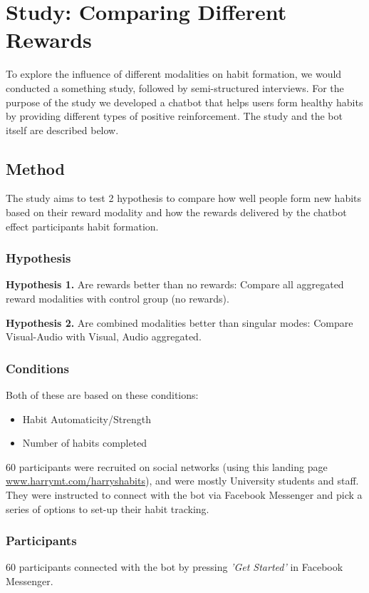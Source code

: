 \documentclass{scaffold/sigchi}
\begin{document}
\section{Study: Comparing Different Rewards}
To explore the influence of different modalities on habit formation, we would conducted a something study, followed by semi-structured interviews. For the purpose of the study we developed a chatbot that helps users form healthy habits by providing different types of positive reinforcement. The study and the bot itself are described below.



\subsection{Method}
The study aims to test 2 hypothesis to compare how well people form new habits based on their reward modality and how the rewards delivered by the chatbot effect participants habit formation.

\subsubsection{Hypothesis}
\textbf{Hypothesis 1.} Are rewards better than no rewards: Compare all aggregated reward modalities with control group (no rewards).


\textbf{Hypothesis 2.} Are combined modalities better than singular modes: Compare Visual-Audio with Visual, Audio aggregated.

\subsubsection{Conditions}
Both of these are based on these conditions:
\begin{itemize}
  \item Habit Automaticity/Strength
  \item Number of habits completed
\end{itemize}

60 participants were recruited on social networks (using this landing page \url{www.harrymt.com/harryshabits}), and were mostly University students and staff. They were instructed to connect with the bot via Facebook Messenger and pick a series of options to set-up their habit tracking.

\subsubsection{Participants}
60 participants connected with the bot by pressing \textit{'Get Started'} in Facebook Messenger.
\end{document}
